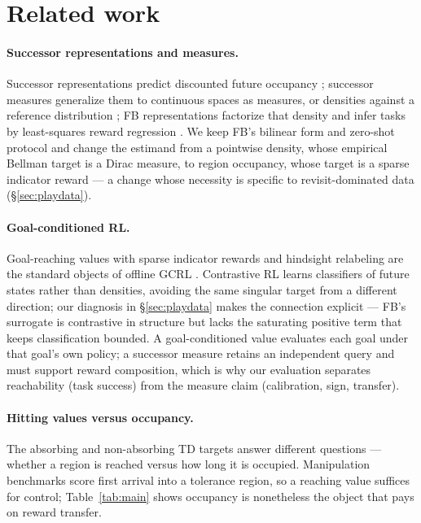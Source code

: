 \documentclass{article}
\begin{document}
\section{Related work}
\label{sec:related}

\paragraph{Successor representations and measures.}
Successor representations predict discounted future occupancy
\citep{dayan1993improving}; successor measures generalize them to continuous
spaces as measures, or densities against a reference distribution
\citep{blier2021learning}; FB representations factorize that density and infer
tasks by least-squares reward regression
\citep{touati2021learning,touati2023does}. We keep FB's bilinear form and
zero-shot protocol and change the estimand from a pointwise density, whose
empirical Bellman target is a Dirac measure, to region occupancy, whose target
is a sparse indicator reward --- a change whose necessity is specific to
revisit-dominated data (\S\ref{sec:playdata}).

\paragraph{Goal-conditioned RL.}
Goal-reaching values with sparse indicator rewards and hindsight relabeling are
the standard objects of offline GCRL
\citep{kaelbling1993learning,andrychowicz2017hindsight,kostrikov2021offline,park2023hiql}.
Contrastive RL \citep{eysenbach2022contrastive} learns classifiers of future
states rather than densities, avoiding the same singular target from a
different direction; our diagnosis in \S\ref{sec:playdata} makes the connection
explicit --- FB's surrogate is contrastive in structure but lacks the
saturating positive term that keeps classification bounded. A goal-conditioned
value evaluates each goal under that goal's own policy; a successor measure
retains an independent query and must support reward composition, which is why
our evaluation separates reachability (task success) from the measure claim
(calibration, sign, transfer).

\paragraph{Hitting values versus occupancy.}
The absorbing and non-absorbing TD targets answer different questions ---
whether a region is reached versus how long it is occupied. Manipulation
benchmarks score first arrival into a tolerance region, so a reaching value
suffices for control; Table~\ref{tab:main} shows occupancy is nonetheless the
object that pays on reward transfer.
\end{document}
